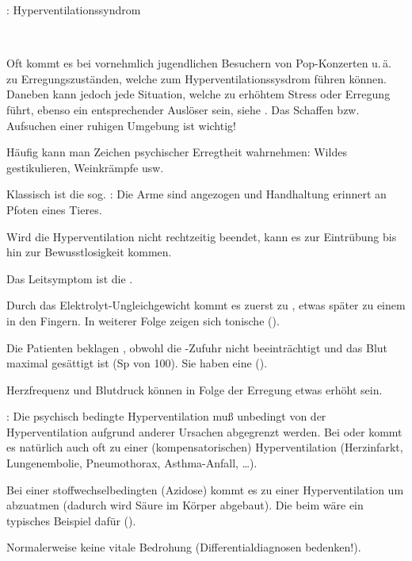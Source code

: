 {\TxABCDE: Hyperventilationssyndrom}
{~
\begin{ABCDEText}
  \item[\ABCDE{1}] Oft kommt es bei vornehmlich
  jugendlichen Besuchern von Pop-Konzerten u.\,ä. zu
  Erregungszuständen, welche zum Hyperventilationssysdrom
  führen können. Daneben kann jedoch jede Situation, welche
  zu erhöhtem Stress oder Erregung führt, ebenso ein
  entsprechender Auslöser sein, 
  siehe . Das Schaffen bzw. Aufsuchen einer ruhigen
  Umgebung ist wichtig!
  \item[\ABCDE{2}] Häufig kann man Zeichen psychischer
  Erregtheit wahrnehmen: Wildes gestikulieren, Weinkrämpfe
  usw.
  
  Klassisch ist die sog. :
  Die Arme sind angezogen und Handhaltung erinnert an Pfoten eines Tieres.
  \item[\ABCDE{3}] Wird die Hyperventilation nicht
  rechtzeitig beendet, kann es zur Eintrübung bis hin zur Bewusstlosigkeit kommen.
  \item[\ABCDE{4}] Das Leitsymptom ist die .
  
  Durch
  das Elektrolyt-Ungleichgewicht kommt es zuerst zu
  , etwas später zu einem
   in den
  Fingern. In weiterer Folge zeigen sich tonische 
  ().
  \item[\ABCDE{B}]  Die Patienten beklagen , obwohl die
  -Zufuhr nicht beeinträchtigt und das Blut maximal
  gesättigt ist (Sp von 100\PC*). Sie haben eine
   ().
  \item[\ABCDE{C}] Herzfrequenz und Blutdruck können in
  Folge der Erregung etwas erhöht sein.
  \item[\ABCDE{E}] : Die psychisch bedingte
  Hyperventilation muß unbedingt von der Hyperventilation 
  aufgrund anderer Ursachen abgegrenzt
  werden. Bei  oder  kommt es natürlich auch
  oft zu einer (kompensatorischen) Hyperventilation
  (Herzinfarkt, Lungenembolie, Pneumothorax, Asthma-Anfall,
  \ldots).
  
  Bei einer stoffwechselbedingten  (Azidose)
  kommt es zu einer Hyperventilation um  abzuatmen
  (dadurch wird Säure im Körper abgebaut). Die
   beim  wäre
  ein typisches Beispiel dafür
  ().
  \item[\ABCDE{=}] Normalerweise keine vitale Bedrohung
  (Differentialdiagnosen bedenken!).
\end{ABCDEText}
}
